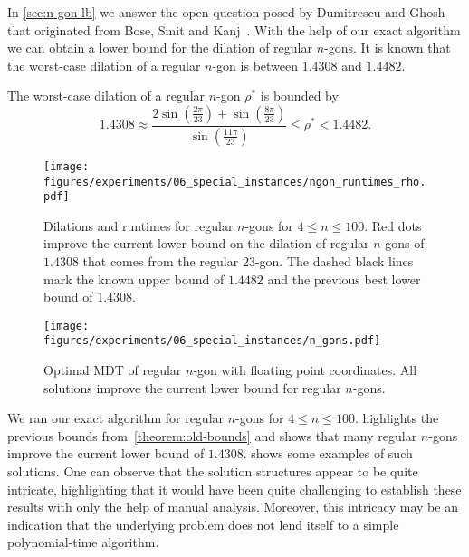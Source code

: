 In \cref{sec:n-gon-lb} we answer the open question posed by Dumitrescu and Ghosh~\cite[Problem 1]{DBLP:journals/ijcga/DumitrescuG16} that originated from Bose, Smit and Kanj~\cite{DBLP:journals/comgeo/BoseS13, DBLP:conf/iccit/Kanj13}.
With the help of our exact algorithm we can obtain a lower bound for the dilation of regular $n$-gons.
It is known that the worst-case dilation of a regular $n$-gon is between $1.4308$ and $1.4482$.

\begin{theorem}
    \label{theorem:old-bounds}
    The worst-case dilation of a regular $n$-gon $\rho^*$ is bounded by
    \[
        1.4308 \approx 
            \frac{2\sin(\frac{2\pi}{23}) + \sin(\frac{8\pi}{23})}{\sin(\frac{11\pi}{23})} \leq \rho^* < 1.4482.
    \]
\end{theorem}

\begin{figure}[t!p]
    \centering
    \texttt{[image: figures/experiments/06\_special\_instances/ngon\_runtimes\_rho.pdf]}
    \caption{Dilations and runtimes for regular $n$-gons for $4 \leq n \leq 100$.
             Red dots improve the current lower bound on the dilation of regular $n$-gons of $1.4308$ that comes from the regular $23$-gon.
             The dashed black lines mark the known upper bound of $1.4482$ and the previous best lower bound of $1.4308$.}
    \label{fig:n-gon-rho-runtimes}
\end{figure}

\begin{figure}[t!p]
    \centering
    \texttt{[image: figures/experiments/06\_special\_instances/n\_gons.pdf]}
    \caption{Optimal MDT of regular $n$-gon with floating point coordinates. All solutions improve the current lower bound for regular $n$-gons.} %
    \label{fig:n-gon-examples}
\end{figure}

We ran our exact algorithm for regular $n$-gons for $4 \leq n \leq 100$. 
 highlights the previous bounds
from~\cref{theorem:old-bounds} and shows that many regular $n$-gons improve the
current lower bound of $1.4308$. 
 shows some examples of such solutions. 
One can observe that the solution structures appear to be quite intricate, 
highlighting that it would have been quite challenging
to establish these results with only the help of manual analysis. Moreover,
this intricacy may be an indication that the underlying problem does not
lend itself to a simple polynomial-time algorithm.

